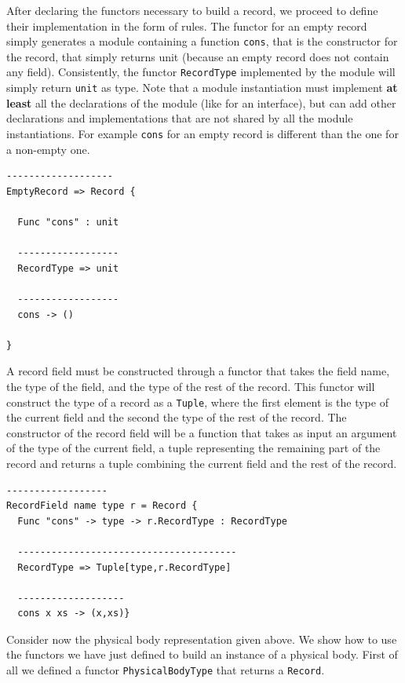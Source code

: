 After declaring the functors necessary to build a record, we proceed to define their implementation in the form of rules. The functor for an empty record simply generates a module containing a function \texttt{cons}, that is the constructor for the record, that simply returns unit (because an empty record does not contain any field). Consistently, the functor \texttt{RecordType} implemented by the module will simply return \texttt{unit} as type. Note that a module instantiation must implement \textbf{at least} all the declarations of the module (like for an interface), but can add other declarations and implementations that are not shared by all the module instantiations. For example \texttt{cons} for an empty record is different than the one for a non-empty one.

\begin{lstlisting}
-------------------
EmptyRecord => Record {

  Func "cons" : unit
  
  ------------------
  RecordType => unit
  
  ------------------
  cons -> ()

}
\end{lstlisting}

A record field must be constructed through a functor that takes the field name, the type of the field, and the type of the rest of the record. This functor will construct the type of a record as a \texttt{Tuple}, where the first element is the type of the current field and the second the type of the rest of the record. The constructor of the record field will be a function that takes as input an argument of the type of the current field, a tuple representing the remaining part of the record and returns a tuple combining the current field and the rest of the record.

\begin{lstlisting}
------------------
RecordField name type r = Record {
  Func "cons" -> type -> r.RecordType : RecordType

  ---------------------------------------
  RecordType => Tuple[type,r.RecordType]

  -------------------
  cons x xs -> (x,xs)}
\end{lstlisting}

Consider now the physical body representation given above. We show how to use the functors we have just defined to build an instance of a physical body. First of all we defined a functor \texttt{PhysicalBodyType} that returns a \texttt{Record}.

